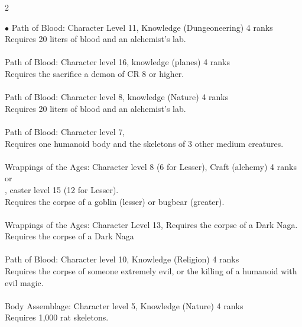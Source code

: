 \begin{multicols}{2}
\begin{small}
\begin{list}{$\bullet$}{\itemspace}
Path of Blood: Character Level 11, Knowledge (Dungeoneering) 4 ranks\\
Requires 20 liters of blood and an alchemist's lab.\\
\\
Path of Blood: Character level 16, knowledge (planes) 4 ranks\\
Requires the sacrifice a demon of CR 8 or higher.\\
\\
Path of Blood: Character level 8, knowledge (Nature) 4 ranks\\
Requires 20 liters of blood and an alchemist's lab.\\
\\
Path of Blood: Character level 7, \\
Requires one humanoid body and the skeletons of 3 other medium creatures.\\
\\
Wrappings of the Ages: Character level 8 (6 for Lesser), Craft (alchemy) 4 ranks\\
or\\
, caster level 15 (12 for Lesser).\\
Requires the corpse of a goblin (lesser) or bugbear (greater).\\
\\
Wrappings of the Ages: Character Level 13, Requires the corpse of a Dark Naga.\\
Requires the corpse of a Dark Naga\\
\\
Path of Blood: Character level 10, Knowledge (Religion) 4 ranks\\
Requires the corpse of someone extremely evil, or the killing of a humanoid with evil magic.\\
\\
Body Assemblage: Character level 5, Knowledge (Nature) 4 ranks\\
Requires 1,000 rat skeletons.\\
\\

\end{list}
\end{small}
\end{multicols}
